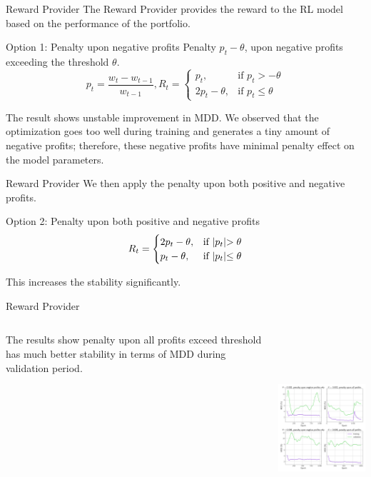 \begin{frame}{Reward Provider}
The Reward Provider provides the reward to the RL model based on the performance of the portfolio.
\begin{block}{Option 1: Penalty upon negative profits}
Penalty \(p_t-\theta\), upon negative profits exceeding the threshold \(\theta\). 
\[
p_t = \frac{w_t-w_{t-1}}{w_{t-1}}
, 
R_t = 
\begin{cases}
    p_t,&\text{if  }p_t > -\theta\\
    2p_t - \theta ,&\text{if  }p_t \leq  \theta
\end{cases}
\]
\end{block}
\alert{
The result shows unstable improvement in MDD. We observed that the optimization goes too well during training and generates a tiny amount of negative profits; therefore, these negative profits have minimal penalty effect on the model parameters.
}

\end{frame}

\begin{frame}{Reward Provider}
We then apply the penalty upon both positive and negative profits. 
\begin{block}{Option 2: Penalty upon both positive and negative profits}
\[
R_t = 
\begin{cases}
    2p_t - \theta,&\text{if  }    $$|p_t|$$ > \theta\\
    p_t - \theta ,&\text{if  } $$|p_t|$$\leq  \theta
\end{cases}
\]
\end{block}
\alert{This increases the stability significantly.}
\end{frame}

\begin{frame}{Reward Provider}
\begin{columns}
\begin{column}{0.35\textwidth}
The results show penalty upon all profits exceed threshold has much better stability in terms of MDD during validation period. 

\end{column}
\begin{column}{0.65\textwidth}
\begin{center}
      \includegraphics[height=7cm]{images/penalty_negtive_profits_compare.png}
\end{center}
\end{column}
\end{columns}
\end{frame}


